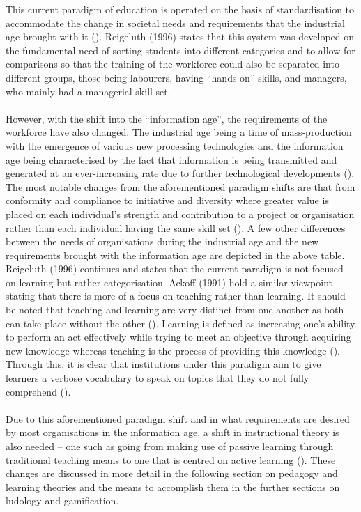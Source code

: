 This current paradigm of education is operated on the basis of standardisation to accommodate the change in societal needs and requirements that the industrial age brought with it (\cite{Reigeluth1996}). Reigeluth (1996) states that this system was developed on the fundamental need of sorting students into different categories and to allow for comparisons so that the training of the workforce could also be separated into different groups, those being labourers, having “hands-on” skills, and managers, who mainly had a managerial skill set. 
\\\\
However, with the shift into the “information age”, the requirements of the workforce have also changed. The industrial age being a time of mass-production with the emergence of various new processing technologies and the information age being characterised by the fact that information is being transmitted and generated at an ever-increasing rate due to further technological developments (\cite{gibson2006games, Reigeluth1996}). The most notable changes from the aforementioned paradigm shifts are that from conformity and compliance to initiative and diversity where greater value is placed on each individual’s strength and contribution to a project or organisation rather than each individual having the same skill set (\cite{Reigeluth1996}).  A few other differences between the needs of organisations during the industrial age and the new requirements brought with the information age are depicted in the above table.
\newpage
\noindent Reigeluth (1996) continues and states that the current paradigm is not focused on learning but rather categorisation. Ackoff (1991) hold a similar viewpoint stating that there is more of a focus on teaching rather than learning. It should be noted that teaching and learning are very distinct from one another as both can take place without the other (\cite{Ackoff1991}). Learning is defined as increasing one’s ability to perform an act effectively while trying to meet an objective through acquiring new knowledge whereas teaching is the process of providing this knowledge (\cite{Ackoff1991}). Through this, it is clear that institutions under this paradigm aim to give learners a verbose vocabulary to speak on topics that they do not fully comprehend (\cite{Ackoff1991}). 
\\\\
Due to this aforementioned paradigm shift and in what requirements are desired by most organisations in the information age, a shift in instructional theory is also needed – one such as going from making use of passive learning through traditional teaching means to one that is centred on active learning (\cite{Reigeluth1996}). These changes are discussed in more detail in the following section on pedagogy and learning theories and the means to accomplish them in the further sections on ludology and gamification.

